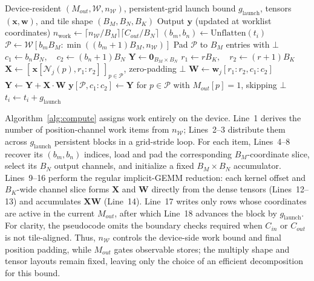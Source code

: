 \begin{algorithm}[htb]
\caption{Persistent Worklist-Driven Implicit GEMM}
\label{alg:compute}
\begin{algorithmic}[1]
\REQUIRE Device-resident $(M_{out},\mathcal{W},n_{\mathcal{W}})$,
         persistent-grid launch bound $g_{\mathrm{launch}}$,
         tensors $(\mathbf{x},\mathbf{w})$, and
         tile shape $(B_M,B_N,B_K)$
\ENSURE Output $\mathbf{y}$ (updated at worklist coordinates)
\STATE $n_{\mathrm{work}} \leftarrow
       \lceil n_{\mathcal{W}}/B_M\rceil\lceil C_{out}/B_N\rceil$
    \STATE $(b_m,b_n) \leftarrow \mathrm{Unflatten}(t_i)$
    \STATE $\mathcal{P} \leftarrow
           \mathcal{W}[b_mB_M:\min((b_m+1)B_M,n_{\mathcal{W}})]$
    \STATE Pad $\mathcal{P}$ to $B_M$ entries with $\bot$
    \STATE $c_1 \leftarrow b_nB_N,\quad
           c_2 \leftarrow (b_n+1)B_N$
    \STATE $\mathbf{Y} \leftarrow \mathbf{0}_{B_M\times B_N}$
        \STATE $r_1 \leftarrow rB_K,\quad
               r_2 \leftarrow (r+1)B_K$
        \STATE $\mathbf{X} \leftarrow
               [\,\mathbf{x}[\mathcal{N}_j(p),r_1:r_2]\,]_{p\in\mathcal{P}}$,
               zero-padding $\bot$
        \STATE $\mathbf{W} \leftarrow \mathbf{w}_j[r_1:r_2,c_1:c_2]$
        \STATE $\mathbf{Y} \leftarrow \mathbf{Y}+\mathbf{X}\cdot\mathbf{W}$
      \ENDFOR
    \ENDFOR
    \STATE $\mathbf{y}[\mathcal{P},c_1:c_2] \leftarrow \mathbf{Y}$ for
           $p\in\mathcal{P}$ with $M_{out}[p]=1$, skipping $\bot$
    \STATE $t_i \leftarrow t_i+g_{\mathrm{launch}}$
  \ENDWHILE
\ENDFOR
\end{algorithmic}
\end{algorithm}

Algorithm~\ref{alg:compute} assigns work entirely on the device. Line~1 derives
the number of position-channel work items from $n_{\mathcal{W}}$; Lines~2--3
distribute them across $g_{\mathrm{launch}}$ persistent blocks in a grid-stride
loop. For each item, Lines~4--8 recover its $(b_m,b_n)$ indices, load and pad
the corresponding $B_M$-coordinate slice, select its $B_N$ output channels,
and initialize a fixed $B_M\times B_N$ accumulator. Lines~9--16 perform the
regular implicit-GEMM reduction: each kernel offset and $B_K$-wide channel slice
forms $\mathbf{X}$ and $\mathbf{W}$ directly from the dense tensors
(Lines~12--13) and accumulates $\mathbf{X}\mathbf{W}$ (Line~14). Line~17 writes
only rows whose coordinates are active in the current $M_{out}$, after which
Line~18 advances the block by $g_{\mathrm{launch}}$. For clarity, the pseudocode
omits the boundary checks required when $C_{in}$ or $C_{out}$ is not
tile-aligned. Thus,
$n_{\mathcal{W}}$ controls the device-side work bound and final position
padding, while $M_{out}$ gates observable stores; the multiply shape and tensor
layouts remain fixed, leaving only the choice of an efficient decomposition for
this bound.

